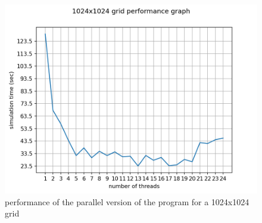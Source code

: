 \documentclass[unicode,11pt,a4paper,oneside,numbers=endperiod,openany]{scrartcl}
\begin{document}
\begin{figure}[H]
\centering
\includegraphics[width=0.8\linewidth]{1024manualplot.png}
\caption{performance of the parallel version of the program for a 1024x1024 grid}
\end{figure}
\end{document}
